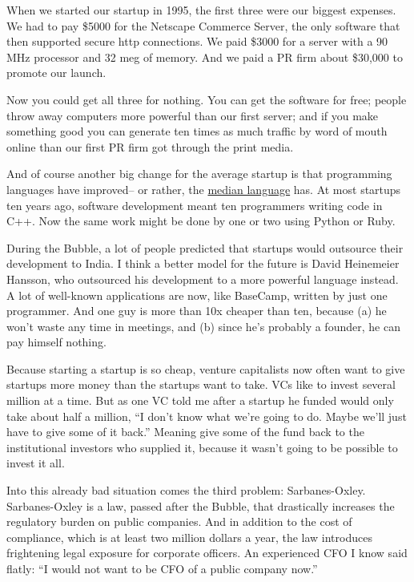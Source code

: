 \documentclass[12pt]{book}
\begin{document}
When we started our startup in 1995, the first three were our biggest
expenses. We had to pay \$5000 for the Netscape Commerce Server, the
only software that then supported secure http connections. We paid
\$3000 for a server with a 90 MHz processor and 32 meg of memory. And we
paid a PR firm about \$30,000 to promote our launch.

Now you could get all three for nothing. You can get the software for
free; people throw away computers more powerful than our first server;
and if you make something good you can generate ten times as much
traffic by word of mouth online than our first PR firm got through the
print media.

And of course another big change for the average startup is that
programming languages have improved-- or rather, the
\href{avg.html}{median language} has. At most startups ten years ago,
software development meant ten programmers writing code in C++. Now the
same work might be done by one or two using Python or Ruby.

During the Bubble, a lot of people predicted that startups would
outsource their development to India. I think a better model for the
future is David Heinemeier Hansson, who outsourced his development to a
more powerful language instead. A lot of well-known applications are
now, like BaseCamp, written by just one programmer. And one guy is more
than 10x cheaper than ten, because (a) he won't waste any time in
meetings, and (b) since he's probably a founder, he can pay himself
nothing.

Because starting a startup is so cheap, venture capitalists now often
want to give startups more money than the startups want to take. VCs
like to invest several million at a time. But as one VC told me after a
startup he funded would only take about half a million, ``I don't know
what we're going to do. Maybe we'll just have to give some of it back.''
Meaning give some of the fund back to the institutional investors who
supplied it, because it wasn't going to be possible to invest it all.

Into this already bad situation comes the third problem: Sarbanes-Oxley.
Sarbanes-Oxley is a law, passed after the Bubble, that drastically
increases the regulatory burden on public companies. And in addition to
the cost of compliance, which is at least two million dollars a year,
the law introduces frightening legal exposure for corporate officers. An
experienced CFO I know said flatly: ``I would not want to be CFO of a
public company now.''
\end{document}
